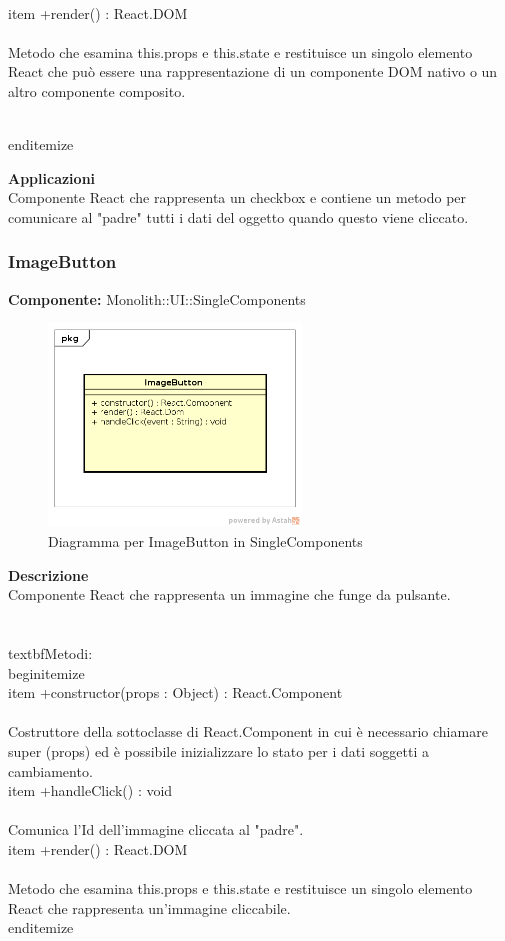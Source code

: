 \\item +render() : React.DOM 
\\\\
Metodo che esamina this.props e this.state e restituisce un singolo elemento React che può essere una rappresentazione di un componente DOM nativo o un altro componente composito.

\\end{itemize} 


\textbf{Applicazioni}\\
Componente React che rappresenta un checkbox e contiene un metodo per comunicare al "padre" tutti i dati del oggetto quando questo viene cliccato. 


\clearpage

\subsubsection{ImageButton}
\textbf{Componente:}  Monolith::UI::SingleComponents\\
   \FloatBarrier
   \begin{figure}[ht]
   \centering
   \includegraphics[width=0.6\textwidth]{img/single-ImageButton}
   \caption{{Diagramma per ImageButton in SingleComponents}}
\end{figure}
\FloatBarrier
\textbf{Descrizione}\\
Componente React che rappresenta un immagine che funge da pulsante. \\\\
\\textbf{Metodi:} 
\\begin{itemize}
\\item +constructor(props : Object) : React.Component 
\\\\
Costruttore della sottoclasse di React.Component in cui è necessario chiamare super (props) ed è possibile inizializzare lo stato per i dati soggetti a cambiamento.
\\item +handleClick() : void 
\\\\
Comunica l'Id dell'immagine cliccata al "padre". 
\\item +render() : React.DOM 
\\\\
Metodo che esamina this.props e this.state e restituisce un singolo elemento React che rappresenta un'immagine cliccabile.
\\end{itemize} 


